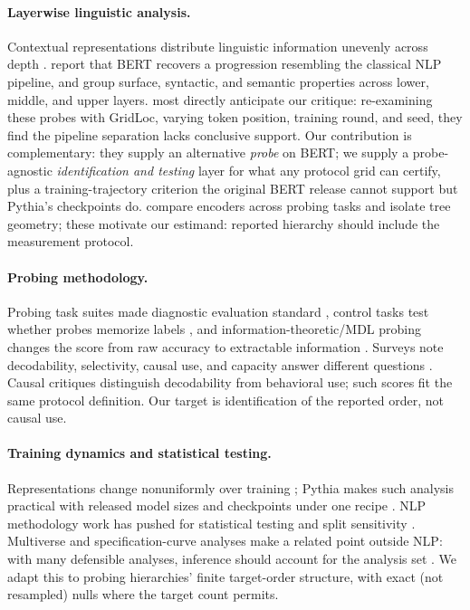 \documentclass[11pt]{article}
\begin{document}
\paragraph{Layerwise linguistic analysis.} Contextual representations distribute linguistic information unevenly across depth \citep{peters2018elmo,peters2018dissecting,devlin2019bert}. \citet{tenney2019bert} report that BERT recovers a progression resembling the classical NLP pipeline, and \citet{jawahar2019bert} group surface, syntactic, and semantic properties across lower, middle, and upper layers. \citet{niu2022doesbert} most directly anticipate our critique: re-examining these probes with GridLoc, varying token position, training round, and seed, they find the pipeline separation lacks conclusive support. Our contribution is complementary: they supply an alternative \emph{probe} on BERT; we supply a probe-agnostic \emph{identification and testing} layer for what any protocol grid can certify, plus a training-trajectory criterion the original BERT release cannot support but Pythia's checkpoints do. \citet{liu2019linguistic} compare encoders across probing tasks and \citet{hewitt2019structural} isolate tree geometry; these motivate our estimand: reported hierarchy should include the measurement protocol.

\paragraph{Probing methodology.} Probing task suites made diagnostic evaluation standard \citep{conneau2018cram}, control tasks test whether probes memorize labels \citep{hewitt2019control}, and information-theoretic/MDL probing changes the score from raw accuracy to extractable information \citep{pimentel2020information,voita2020information}. Surveys note decodability, selectivity, causal use, and capacity answer different questions \citep{belinkov2022probing}. Causal critiques \citep{ravichander2021probing,elazar2021amnesic,amini2023naturalistic,ravfogel2020nullit} distinguish decodability from behavioral use; such scores fit the same protocol definition. Our target is identification of the reported order, not causal use.

\paragraph{Training dynamics and statistical testing.} Representations change nonuniformly over training \citep{saphralopez2019svcca,voita2019bottomup,merchant2020happens}; Pythia makes such analysis practical with released model sizes and checkpoints under one recipe \citep{biderman2023pythia}. NLP methodology work has pushed for statistical testing and split sensitivity \citep{dror2018hitchhiker,gormanbedrick2019standardsplits}. Multiverse and specification-curve analyses make a related point outside NLP: with many defensible analyses, inference should account for the analysis set \citep{steegen2016multiverse,simonsohn2020specification,gelmanloken2013gardenforking}. We adapt this to probing hierarchies' finite target-order structure, with exact (not resampled) nulls where the target count permits.
\end{document}
